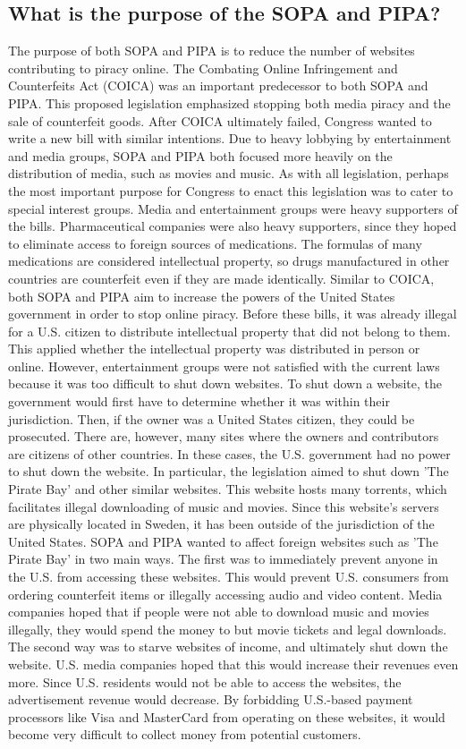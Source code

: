 \documentclass[11pt,journal,compsoc]{IEEEtran}
\begin{document}
\subsection{What is the purpose of the SOPA and PIPA?}
The purpose of both SOPA and PIPA is to reduce the number of websites contributing to piracy online. The Combating Online Infringement and Counterfeits Act (COICA) was an important predecessor to both SOPA and PIPA. This proposed legislation emphasized stopping both media piracy and the sale of counterfeit goods. After COICA ultimately failed, Congress wanted to write a new bill with similar intentions. Due to heavy lobbying by entertainment and media groups, SOPA and PIPA both focused more heavily on the distribution of media, such as movies and music.  
\indent As with all legislation, perhaps the most important purpose for Congress to enact this legislation was to cater to special interest groups. Media and entertainment groups were heavy supporters of the bills. Pharmaceutical companies were also heavy supporters, since they hoped to eliminate access to foreign sources of medications. The formulas of many medications are considered intellectual property, so drugs manufactured in other countries are counterfeit even if they are made identically. 
\indent Similar to COICA, both SOPA and PIPA aim to increase the powers of the United States government in order to stop online piracy. Before these bills, it was already illegal for a U.S. citizen to distribute intellectual property that did not belong to them. This applied whether the intellectual property was distributed in person or online. However, entertainment groups were not satisfied with the current laws because it was too difficult to shut down websites. To shut down a website, the government would first have to determine whether it was within their jurisdiction. Then, if the owner was a United States citizen, they could be prosecuted. There are, however, many sites where the owners and contributors are citizens of other countries. In these cases, the U.S. government had no power to shut down the website. In particular, the legislation aimed to shut down 'The Pirate Bay' and other similar websites. This website hosts many torrents, which facilitates illegal downloading of music and movies. Since this website's servers are physically located in Sweden, it has been outside of the jurisdiction of the United States. 
\indent SOPA and PIPA wanted to affect foreign websites such as 'The Pirate Bay' in two main ways. The first was to immediately prevent anyone in the U.S. from accessing these websites. This would prevent U.S. consumers from ordering counterfeit items or illegally accessing audio and video content. Media companies hoped that if people were not able to download music and movies illegally, they would spend the money to but movie tickets and legal downloads. The second way was to starve websites of income, and ultimately shut down the website. U.S. media companies hoped that this would increase their revenues even more. Since U.S. residents would not be able to access the websites, the advertisement revenue would decrease. By forbidding U.S.-based payment processors like Visa and MasterCard from operating on these websites, it would become very difficult to collect money from potential customers.  
\end{document}
